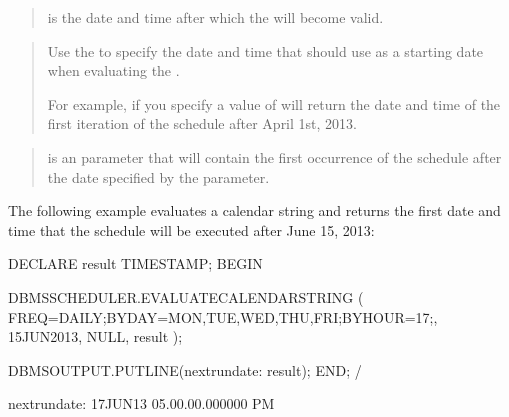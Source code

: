 \documentclass[letterpaper,10pt,english,openany,oneside]{sphinxmanual}
\begin{document}
\begin{quote}

 is the date and time after which the
 will become valid.
\end{quote}

\begin{quote}

Use the  to specify the date and time
that  should use as a starting date when
evaluating the .

For example, if you specify a  value of
 will return
the date and time of the first iteration of the schedule after April
1st, 2013.
\end{quote}

\begin{quote}

 is an  parameter that will contain the first
occurrence of the schedule after the date specified by the
 parameter.
\end{quote}


The following example evaluates a calendar string and returns the first
date and time that the schedule will be executed after June 15, 2013:

%
\begin{sphinxVerbatim}[commandchars=\\\{\}]
DECLARE
  result     TIMESTAMP;
BEGIN

  DBMS\PYGZus{}SCHEDULER.EVALUATE\PYGZus{}CALENDAR\PYGZus{}STRING
  (
    \PYGZsq{}FREQ=DAILY;BYDAY=MON,TUE,WED,THU,FRI;BYHOUR=17;\PYGZsq{},
    \PYGZsq{}15\PYGZhy{}JUN\PYGZhy{}2013\PYGZsq{}, NULL, result
  );

    DBMS\PYGZus{}OUTPUT.PUT\PYGZus{}LINE(\PYGZsq{}next\PYGZus{}run\PYGZus{}date: \PYGZsq{} \textbar{}\textbar{} result);
END;
/

next\PYGZus{}run\PYGZus{}date: 17\PYGZhy{}JUN\PYGZhy{}13 05.00.00.000000 PM
\end{sphinxVerbatim}
\end{document}
